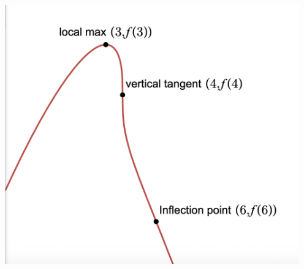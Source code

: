 \documentclass{ximera}
\begin{document}
\begin{enumerate}
\begin{center}
\centerline{\includegraphics[width = 5in]{./AppDerivativesGraphics/graphfromderivativeexerciseanswer.png}}
\end{center}


\setcounter{HW}{\value{enumi}}
\end{enumerate}
\end{document}

